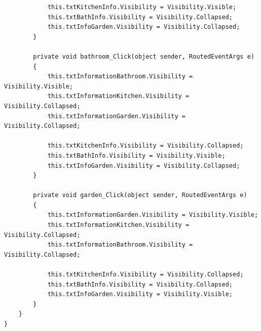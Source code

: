 \documentclass[runningheads,a4paper]{llncs}
\begin{document}
\begin{lstlisting}
            this.txtKitchenInfo.Visibility = Visibility.Visible;
            this.txtBathInfo.Visibility = Visibility.Collapsed;
            this.txtInfoGarden.Visibility = Visibility.Collapsed;
        }

        private void bathroom_Click(object sender, RoutedEventArgs e)
        {
            this.txtInformationBathroom.Visibility = Visibility.Visible;
            this.txtInformationKitchen.Visibility = Visibility.Collapsed;
            this.txtInformationGarden.Visibility = Visibility.Collapsed;

            this.txtKitchenInfo.Visibility = Visibility.Collapsed;
            this.txtBathInfo.Visibility = Visibility.Visible;
            this.txtInfoGarden.Visibility = Visibility.Collapsed;
        }

        private void garden_Click(object sender, RoutedEventArgs e)
        {
            this.txtInformationGarden.Visibility = Visibility.Visible;
            this.txtInformationKitchen.Visibility = Visibility.Collapsed;
            this.txtInformationBathroom.Visibility = Visibility.Collapsed;

            this.txtKitchenInfo.Visibility = Visibility.Collapsed;
            this.txtBathInfo.Visibility = Visibility.Collapsed;
            this.txtInfoGarden.Visibility = Visibility.Visible;
        }
    }
}
\end{lstlisting}




\end{document}
